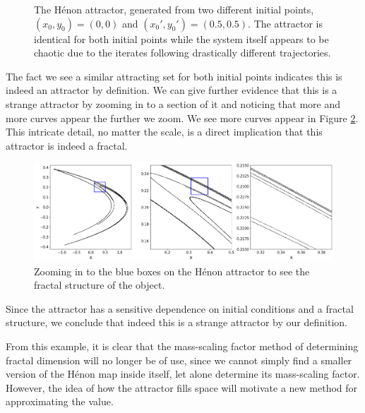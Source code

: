 \begin{exmp}
\begin{figure}
        \caption{The Hénon attractor, generated from two different initial points, $(x_0,y_0) = (0,0)$ and $(x_0',y_0') = (0.5,0.5)$. The attractor is identical for both initial points while the system itself appears to be chaotic due to the iterates following drastically different trajectories.}
        \label{fig:Henon2}
    \end{figure}
    The fact we see a similar attracting set for both initial points indicates this is indeed an attractor by definition. We can give further evidence that this is a strange attractor by zooming in to a section of it and noticing that more and more curves appear the further we zoom. We see more curves appear in Figure \ref{fig:Henon3}. This intricate detail, no matter the scale, is a direct implication that this attractor is indeed a fractal.
    \begin{figure}
        \centering
        \includegraphics[width=1\linewidth]{Images/henon zoom.png}
        \caption{Zooming in to the blue boxes on the Hénon attractor to see the fractal structure of the object.}
        \label{fig:Henon3}
    \end{figure}
    Since the attractor has a sensitive dependence on initial conditions and a fractal structure, we conclude that indeed this is a strange attractor by our definition.
\end{exmp}
From this example, it is clear that the mass-scaling factor method of determining fractal dimension will no longer be of use, since we cannot simply find a smaller version of the Hénon map inside itself, let alone determine its mass-scaling factor. However, the idea of how the attractor fills space will motivate a new method for approximating the value.\\

